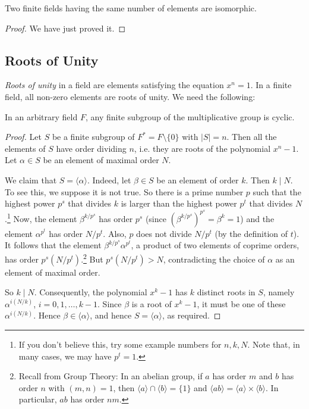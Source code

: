 \begin{theorem}
	Two finite fields having the same number of elements are isomorphic.
	\begin{proof}
		We have just proved it.
	\end{proof}
\end{theorem}

\subsection{Roots of Unity}
\emph{Roots of unity} in a field are elements satisfying the equation $x^n = 1$. In a finite field, all non-zero elements are roots of unity. We need the following:

\begin{lemma}\label{lem:finite-mult-subgroup-is-cyclic}
	In an arbitrary field $F$, any finite subgroup of the multiplicative group is cyclic.
	\begin{proof}
		Let $S$ be a finite subgroup of $F^* = F \setminus \{0\}$ with $|S| = n$. Then all the elements of $S$ have order dividing $n$, i.e. they are roots of the polynomial $x^n - 1$. Let $\alpha \in S$ be an element of maximal order $N$.
		
		We claim that $S = \langle \alpha \rangle$. Indeed, let $\beta \in S$ be an element of order $k$. Then $k \mid N$. To see this, we suppose it is not true. So there is a prime number $p$ such that the highest power $p^s$ that divides $k$ is larger than the highest power $p^t$ that divides $N$.\footnote{If you don't believe this, try some example numbers for $n, k, N$. Note that, in many cases, we may have $p^t = 1$.} Now, the element $\beta^{k / p^s}$ has order $p^s$ (since $(\beta^{k / p^s})^{p^s} = \beta^k = 1$) and the element $\alpha^{p^t}$ has order $N / p^t$. Also, $p$ does not divide $N / p^t$ (by the definition of $t$). It follows that the element $\beta^{k / p^s} \alpha^{p^t}$, a product of two elements of coprime orders, has order $p^s (N / p^t)$.\footnote{Recall from Group Theory: In an abelian group, if $a$ has order $m$ and $b$ has order $n$ with $(m, n) = 1$, then $\langle a \rangle \cap \langle b \rangle = \{1\}$ and $\langle ab \rangle = \langle a \rangle \times \langle b \rangle$. In particular, $ab$ has order $nm$.} But $p^s (N / p^t) > N$, contradicting the choice of $\alpha$ as an element of maximal order.
		
		So $k \mid N$. Consequently, the polynomial $x^k - 1$ has $k$ distinct roots in $S$, namely $\alpha^{i(N / k)}$, $i = 0, 1, \dots, k - 1$. Since $\beta$ is a root of $x^k - 1$, it must be one of these $\alpha^{i(N / k)}$. Hence $\beta \in \langle \alpha \rangle$, and hence $S = \langle \alpha \rangle$, as required.
	\end{proof}
\end{lemma}

